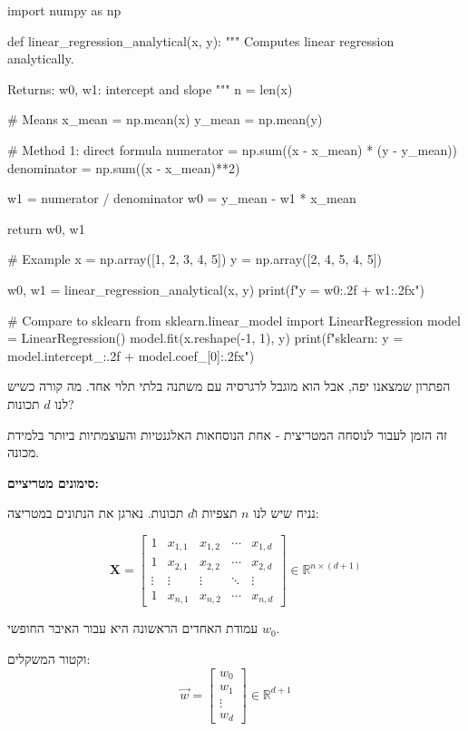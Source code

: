 \begin{pythonbox}
import numpy as np

def linear_regression_analytical(x, y):
    """
    Computes linear regression analytically.

    Returns:
        w0, w1: intercept and slope
    """
    n = len(x)

    # Means
    x_mean = np.mean(x)
    y_mean = np.mean(y)

    # Method 1: direct formula
    numerator = np.sum((x - x_mean) * (y - y_mean))
    denominator = np.sum((x - x_mean)**2)

    w1 = numerator / denominator
    w0 = y_mean - w1 * x_mean

    return w0, w1

# Example
x = np.array([1, 2, 3, 4, 5])
y = np.array([2, 4, 5, 4, 5])

w0, w1 = linear_regression_analytical(x, y)
print(f"y = {w0:.2f} + {w1:.2f}x")

# Compare to sklearn
from sklearn.linear_model import LinearRegression
model = LinearRegression()
model.fit(x.reshape(-1, 1), y)
print(f"sklearn: y = {model.intercept_:.2f} + {model.coef_[0]:.2f}x")
\end{pythonbox}


הפתרון שמצאנו יפה, אבל הוא מוגבל לרגרסיה עם משתנה בלתי תלוי אחד. מה קורה כשיש לנו $d$ תכונות?

זה הזמן לעבור לנוסחה המטריצית - אחת הנוסחאות האלגנטיות והעוצמתיות ביותר בלמידת מכונה.

\textbf{סימונים מטריציים:}

נניח שיש לנו $n$ תצפיות ו\en{-}$d$ תכונות. נארגן את הנתונים במטריצה:

\begin{equation}
\mathbf{X} = \begin{bmatrix}
1 & x_{1,1} & x_{1,2} & \cdots & x_{1,d} \\
1 & x_{2,1} & x_{2,2} & \cdots & x_{2,d} \\
\vdots & \vdots & \vdots & \ddots & \vdots \\
1 & x_{n,1} & x_{n,2} & \cdots & x_{n,d}
\end{bmatrix} \in \mathbb{R}^{n \times (d+1)}
\end{equation}

עמודת האחדים הראשונה היא עבור האיבר החופשי $w_0$.

וקטור המשקלים:
\begin{equation}
\vec{w} = \begin{bmatrix} w_0 \\ w_1 \\ \vdots \\ w_d \end{bmatrix} \in \mathbb{R}^{d+1}
\end{equation}

